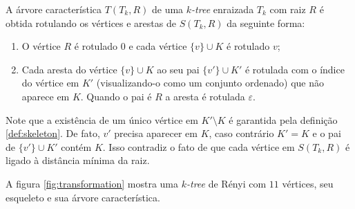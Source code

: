 \begin{definition}
  \cite{caminiti} A árvore característica $T(T_k, R)$ de uma \emph{$k$-tree} enraizada $T_k$ com raiz $R$ é obtida rotulando os vértices e arestas de $S(T_k, R)$ da seguinte forma:

  \begin{enumerate}
    \item O vértice $R$ é rotulado $0$ e cada vértice $\{v\} \cup K$ é rotulado $v$;
    \item Cada aresta do vértice $\{v\} \cup K$ ao seu pai $\{v'\} \cup K'$ é rotulada com o índice do vértice em $K'$ (visualizando-o como um conjunto ordenado) que não aparece em $K$. Quando o pai é $R$ a aresta é rotulada $\varepsilon$.
  \end{enumerate}

  Note que a existência de um único vértice em $K' \setminus K$ é garantida pela definição \ref{def:skeleton}. De fato, $v'$ precisa aparecer em $K$, caso contrário $K' = K$ e o pai de $\{v'\} \cup K'$ contém $K$. Isso contradiz o fato de que cada vértice em $S(T_k, R)$ é ligado à distância mínima da raiz.
\end{definition}

A figura \ref{fig:transformation} mostra uma \emph{$k$-tree} de Rényi com $11$ vértices, seu esqueleto e sua árvore característica.

